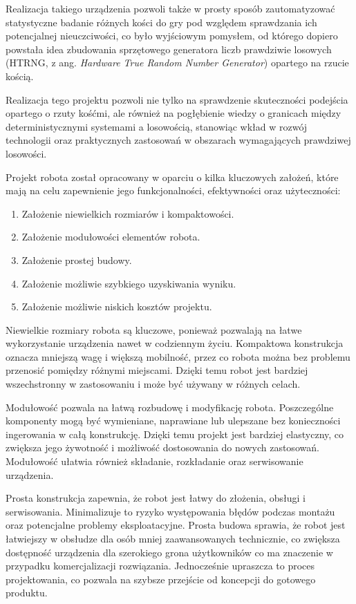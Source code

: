 Realizacja takiego urządzenia pozwoli także w prosty sposób zautomatyzować statystyczne badanie różnych
kości do gry pod względem sprawdzania ich potencjalnej nieuczciwości,
co było wyjściowym pomysłem, od którego dopiero powstała idea zbudowania sprzętowego generatora liczb prawdziwie losowych
(HTRNG, z ang. \textit{Hardware True Random Number Generator}) opartego na rzucie kością.

Realizacja tego projektu pozwoli nie tylko na sprawdzenie skuteczności podejścia opartego o rzuty kośćmi,
ale również na pogłębienie wiedzy o granicach między deterministycznymi systemami a losowością,
stanowiąc wkład w rozwój technologii oraz praktycznych zastosowań w obszarach wymagających prawdziwej losowości.

Projekt robota został opracowany w oparciu o kilka kluczowych założeń, które mają na celu zapewnienie jego funkcjonalności, efektywności oraz użyteczności:
\begin{enumerate}
    \item Założenie niewielkich rozmiarów i kompaktowości.
    \item Założenie modułowości elementów robota.
    \item Założenie prostej budowy.
    \item Założenie możliwie szybkiego uzyskiwania wyniku.
    \item Założenie możliwie niskich kosztów projektu.
\end{enumerate}

Niewielkie rozmiary robota są kluczowe, ponieważ pozwalają na łatwe wykorzystanie urządzenia nawet w codziennym życiu.
Kompaktowa konstrukcja oznacza mniejszą wagę i większą mobilność, przez co robota można bez problemu przenosić pomiędzy różnymi miejscami.
Dzięki temu robot jest bardziej wszechstronny w zastosowaniu i może być używany w różnych celach.

Modułowość pozwala na łatwą rozbudowę i modyfikację robota.
Poszczególne komponenty mogą być wymieniane, naprawiane lub ulepszane bez konieczności ingerowania w całą konstrukcję.
Dzięki temu projekt jest bardziej elastyczny, co zwiększa jego żywotność i możliwość dostosowania do nowych zastosowań.
Modułowość ułatwia również składanie, rozkładanie oraz serwisowanie urządzenia.

Prosta konstrukcja zapewnia, że robot jest łatwy do złożenia, obsługi i serwisowania.
Minimalizuje to ryzyko występowania błędów podczas montażu oraz potencjalne problemy eksploatacyjne.
Prosta budowa sprawia, że robot jest łatwiejszy w obsłudze dla osób mniej zaawansowanych technicznie, co zwiększa dostępność
urządzenia dla szerokiego grona użytkowników co ma znaczenie w przypadku komercjalizacji rozwiązania.
Jednocześnie upraszcza to proces projektowania, co pozwala na szybsze przejście od koncepcji do gotowego produktu.

